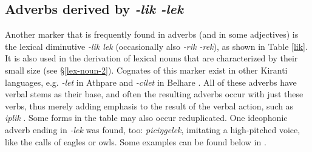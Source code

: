     
\subsection{Adverbs derived by  \emph{-lik \ti -lek}}

Another marker that is frequently found  in adverbs (and in some adjectives) is the lexical diminutive \emph{-lik \ti lek} (occasionally also \emph{-rik \ti -rek}), as shown in Table \ref{lik}. It is also used in the derivation of lexical nouns that are characterized by their small size (see §\ref{lex-noun-2}). Cognates of this marker exist in other Kiranti languages, e.g. \emph{-let} in Athpare \cite{Ebert1997A-grammar} and \emph{-cilet} in Belhare  \citep{Bickel2003Belhare}. All of these adverbs have verbal stems as their base, and often the resulting adverbs occur with just these verbs, thus merely adding  emphasis to the result of the verbal action, such as \emph{iplik} . Some forms in the table may also occur reduplicated. One ideophonic adverb ending in \emph{-lek} was found, too: \emph{piciŋgelek}, imitating a high-pitched voice, like the calls of eagles or owls. Some examples can be found below in \Next.



